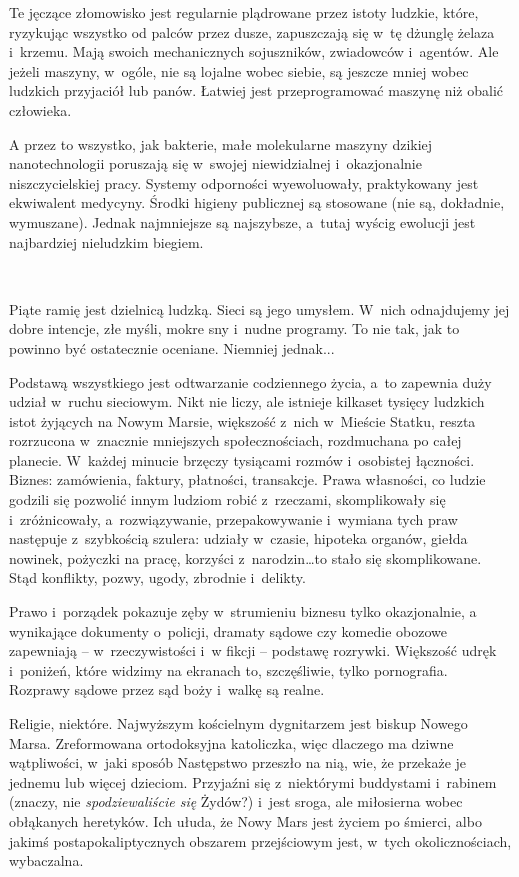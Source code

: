 \documentclass[oneside,polish,11pt,sfheadings]{mwbk}
\begin{document}
Te jęczące złomowisko jest regularnie plądrowane przez istoty ludzkie,
które, ryzykując wszystko od palców przez dusze, zapuszczają się w~tę
dżunglę żelaza i~krzemu. Mają swoich mechanicznych sojuszników,
zwiadowców i~agentów. Ale jeżeli maszyny, w~ogóle, nie są lojalne wobec
siebie, są jeszcze mniej wobec ludzkich przyjaciół lub panów. Łatwiej
jest przeprogramować maszynę niż obalić człowieka.

A przez to wszystko, jak bakterie, małe molekularne maszyny dzikiej
nanotechnologii poruszają się w~swojej niewidzialnej i~okazjonalnie
niszczycielskiej pracy. Systemy odporności wyewoluowały, praktykowany
jest ekwiwalent medycyny. Środki higieny publicznej są stosowane (nie
są, dokładnie, wymuszane). Jednak najmniejsze są najszybsze, a~tutaj
wyścig ewolucji jest najbardziej nieludzkim biegiem.

~

Piąte ramię jest dzielnicą ludzką. Sieci są jego umysłem. W~nich
odnajdujemy jej dobre intencje, złe myśli, mokre sny i~nudne programy.
To nie tak, jak to powinno być ostatecznie oceniane. Niemniej jednak...

Podstawą wszystkiego jest odtwarzanie codziennego życia, a~to zapewnia
duży udział w~ruchu sieciowym. Nikt nie liczy, ale istnieje kilkaset
tysięcy ludzkich istot żyjących na Nowym Marsie, większość z~nich w~Mieście Statku, reszta rozrzucona w~znacznie mniejszych
społecznościach, rozdmuchana po całej planecie. W~każdej minucie
brzęczy tysiącami rozmów i~osobistej łączności. Biznes: zamówienia,
faktury, płatności, transakcje. Prawa własności, co ludzie godzili się
pozwolić innym ludziom robić z~rzeczami, skomplikowały się i~zróżnicowały, a~rozwiązywanie, przepakowywanie i~wymiana tych praw
następuje z~szybkością szulera: udziały w~czasie, hipoteka organów,
giełda nowinek, pożyczki na pracę, korzyści z~narodzin\ldots to stało się
skomplikowane. Stąd konflikty, pozwy, ugody, zbrodnie i~delikty.

Prawo i~porządek pokazuje zęby w~strumieniu biznesu tylko okazjonalnie,
a wynikające dokumenty o~policji, dramaty sądowe czy komedie obozowe
zapewniają -- w~rzeczywistości i~w fikcji -- podstawę rozrywki. Większość
udręk i~poniżeń, które widzimy na ekranach to, szczęśliwie, tylko
pornografia. Rozprawy sądowe przez sąd boży i~walkę są realne.

Religie, niektóre. Najwyższym kościelnym dygnitarzem jest biskup Nowego
Marsa. Zreformowana ortodoksyjna katoliczka, więc dlaczego ma dziwne
wątpliwości, w~jaki sposób Następstwo przeszło na nią, wie, że przekaże
je jednemu lub więcej dzieciom. Przyjaźni się z~niektórymi buddystami i~rabinem (znaczy, nie \emph{spodziewaliście się} Żydów?) i~jest sroga,
ale miłosierna wobec obłąkanych heretyków. Ich ułuda, że Nowy Mars jest
życiem po śmierci, albo jakimś postapokaliptycznych obszarem
przejściowym jest, w~tych okolicznościach, wybaczalna.
\end{document}
